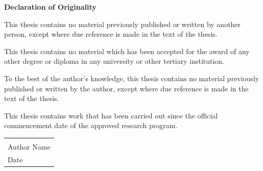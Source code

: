 
\noindent\textbf{Declaration of Originality}

\vspace{1em}

\noindent This thesis contains no material previously published or written by another person, except where due reference is made in the text of the thesis.

\vspace{1em}

\noindent This thesis contains no material which has been accepted for the award of any other degree or diploma in any university or other tertiary institution.

\vspace{1em}

\noindent To the best of the author's knowledge, this thesis contains no material previously published or written by the author, except where due reference is made in the text of the thesis.

\vspace{1em}

\noindent This thesis contains work that has been carried out since the official commencement date of the approved research program.

\vspace{2em}

\noindent\begin{tabular}{@{}p{3in}@{}}
    \hrulefill \\
    Author Name \\
    Date
\end{tabular}

 